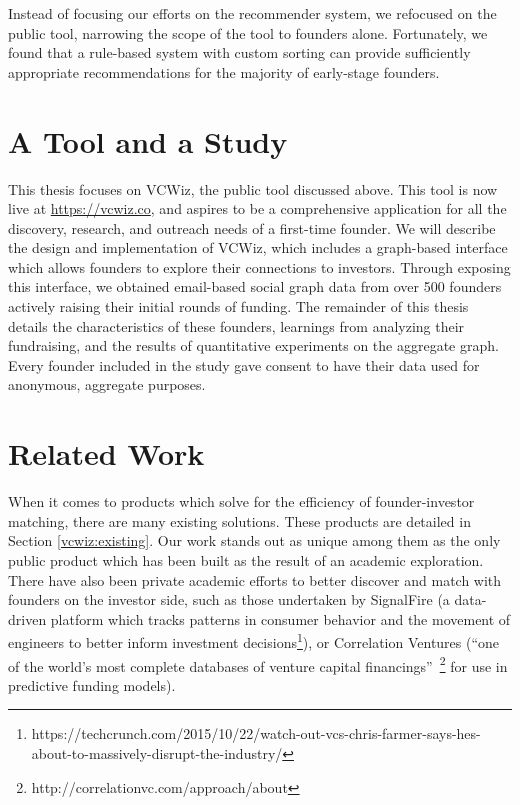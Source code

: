 Instead of focusing our efforts on the recommender system, we refocused on the public tool, narrowing the scope of the tool to founders alone. Fortunately, we found that a rule-based system with custom sorting can provide sufficiently appropriate recommendations for the majority of early-stage founders.

\section{A Tool and a Study}

This thesis focuses on VCWiz, the public tool discussed above. This tool is now live at \url{https://vcwiz.co}, and aspires to be a comprehensive application for all the discovery, research, and outreach needs of a first-time founder. We will describe the design and implementation of VCWiz, which includes a graph-based interface which allows founders to explore their connections to investors. Through exposing this interface, we obtained email-based social graph data from over 500 founders actively raising their initial rounds of funding. The remainder of this thesis details the characteristics of these founders, learnings from analyzing their fundraising, and the results of quantitative experiments on the aggregate graph. Every founder included in the study gave consent to have their data used for anonymous, aggregate purposes.

\section{Related Work}

When it comes to products which solve for the efficiency of founder-investor matching, there are many existing solutions. These products are detailed in Section \ref{vcwiz:existing}. Our work stands out as unique among them as the only public product which has been built as the result of an academic exploration. There have also been private academic efforts to better discover and match with founders on the investor side, such as those undertaken by SignalFire (a data-driven platform which tracks patterns in consumer behavior and the movement of engineers to better inform investment decisions\footnote{https://techcrunch.com/2015/10/22/watch-out-vcs-chris-farmer-says-hes-about-to-massively-disrupt-the-industry/}), or Correlation Ventures (``one of the world's most complete databases of venture capital financings''~\footnote{http://correlationvc.com/approach/about} for use in predictive funding models).

